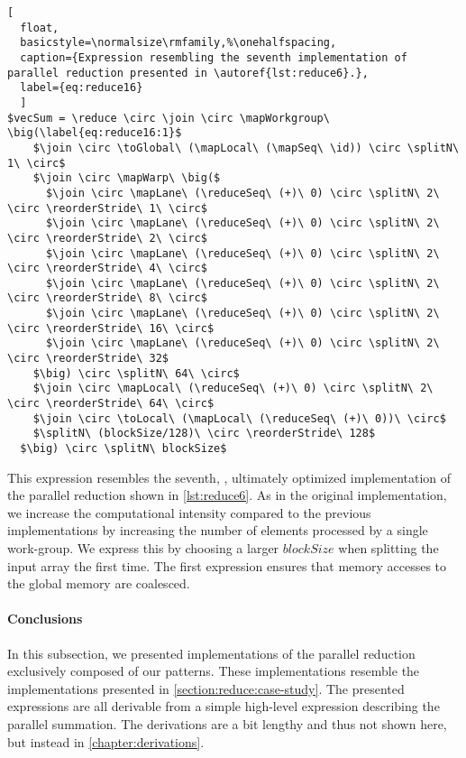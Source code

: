 \begin{lstlisting}[
  float,
  basicstyle=\normalsize\rmfamily,%\onehalfspacing,
  caption={Expression resembling the seventh implementation of parallel reduction presented in \autoref{lst:reduce6}.},
  label={eq:reduce16}
  ]
$vecSum = \reduce \circ \join \circ \mapWorkgroup\ \big(\label{eq:reduce16:1}$
    $\join \circ \toGlobal\ (\mapLocal\ (\mapSeq\ \id)) \circ \splitN\ 1\ \circ$
    $\join \circ \mapWarp\ \big($
      $\join \circ \mapLane\ (\reduceSeq\ (+)\ 0) \circ \splitN\ 2\ \circ \reorderStride\ 1\ \circ$
      $\join \circ \mapLane\ (\reduceSeq\ (+)\ 0) \circ \splitN\ 2\ \circ \reorderStride\ 2\ \circ$
      $\join \circ \mapLane\ (\reduceSeq\ (+)\ 0) \circ \splitN\ 2\ \circ \reorderStride\ 4\ \circ$
      $\join \circ \mapLane\ (\reduceSeq\ (+)\ 0) \circ \splitN\ 2\ \circ \reorderStride\ 8\ \circ$
      $\join \circ \mapLane\ (\reduceSeq\ (+)\ 0) \circ \splitN\ 2\ \circ \reorderStride\ 16\ \circ$
      $\join \circ \mapLane\ (\reduceSeq\ (+)\ 0) \circ \splitN\ 2\ \circ \reorderStride\ 32$
    $\big) \circ \splitN\ 64\ \circ$
    $\join \circ \mapLocal\ (\reduceSeq\ (+)\ 0) \circ \splitN\ 2\ \circ \reorderStride\ 64\ \circ$
    $\join \circ \toLocal\ (\mapLocal\ (\reduceSeq\ (+)\ 0))\ \circ$
    $\splitN\ (blockSize/128)\ \circ \reorderStride\ 128$
  $\big) \circ \splitN\ blockSize$
\end{lstlisting}
%
This expression resembles the seventh, \ie, ultimately optimized implementation of the parallel reduction shown in \autoref{lst:reduce6}.
As in the original \OpenCL implementation, we increase the computational intensity compared to the previous implementations by increasing the number of elements processed by a single work-group.
We express this by choosing a larger $blockSize$ when splitting the input array the first time.
The first \reorderStride expression ensures that memory accesses to the global memory are coalesced.


\paragraph{Conclusions}
In this subsection, we presented implementations of the parallel reduction exclusively composed of our patterns.
These implementations resemble the \OpenCL implementations presented in \autoref{section:reduce:case-study}.
The presented expressions are all derivable from a simple high-level expression describing the parallel summation.
The derivations are a bit lengthy and thus not shown here, but instead in \autoref{chapter:derivations}.

